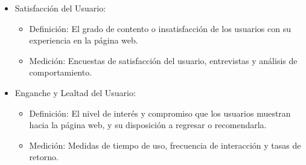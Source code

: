 \begin{itemize}
    \item Satisfacción del Usuario: \cite{bargas2011old}
    \begin{itemize}
        \item Definición: El grado de contento o insatisfacción de los usuarios con su experiencia en la página web.
        \item Medición: Encuestas de satisfacción del usuario, entrevistas y análisis de comportamiento.
    \end{itemize}

    \item Enganche y Lealtad del Usuario: \cite{bargas2011old}
    \begin{itemize}
        \item Definición: El nivel de interés y compromiso que los usuarios muestran hacia la página web, y su disposición a regresar o recomendarla.
        \item Medición:  Medidas de tiempo de uso, frecuencia de interacción y tasas de retorno.
    \end{itemize}
\end{itemize}

